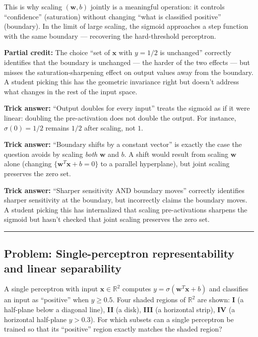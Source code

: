 \documentclass[12pt]{amsart}
\newcommand{\divider}{
  \vspace{-1em}
  \noindent
  \raisebox{-0.15ex}{\textbullet}%
  \hspace{0.5em}%
  \rule[0.5ex]{0.95\textwidth}{1.0pt}%
  \hspace{0.5em}%
  \raisebox{-0.15ex}{\textbullet}%
  \vspace{0em}
}
\begin{document}
This is why scaling $(\mathbf{w}, b)$ jointly is a meaningful operation:
it controls ``confidence'' (saturation) without changing ``what is classified
positive'' (boundary). In the limit of large scaling, the sigmoid approaches
a step function with the same boundary --- recovering the hard-threshold
perceptron.

\textbf{Partial credit:}
The choice ``set of $\mathbf{x}$ with $y = 1/2$ is unchanged'' correctly
identifies that the boundary is unchanged --- the harder of the two effects ---
but misses the saturation-sharpening effect on output values away from the
boundary. A student picking this has the geometric invariance right but
doesn't address what changes in the rest of the input space.

\textbf{Trick answer:}
``Output doubles for every input'' treats the sigmoid as if it were linear:
doubling the pre-activation does not double the output. For instance,
$\sigma(0) = 1/2$ remains $1/2$ after scaling, not $1$.

\textbf{Trick answer:}
``Boundary shifts by a constant vector'' is exactly the case the question
avoids by scaling \emph{both} $\mathbf{w}$ and $b$. A shift would result
from scaling $\mathbf{w}$ alone (changing $\{\mathbf{w}^T\mathbf{x} + b = 0\}$
to a parallel hyperplane), but joint scaling preserves the zero set.

\textbf{Trick answer:}
``Sharper sensitivity AND boundary moves'' correctly identifies sharper
sensitivity at the boundary, but incorrectly claims the boundary moves.
A student picking this has internalized that scaling pre-activations sharpens
the sigmoid but hasn't checked that joint scaling preserves the zero set.

\divider

\subsection*{Problem: Single-perceptron representability and linear separability}

A single perceptron with input $\mathbf{x} \in \mathbb{R}^2$ computes
$y = \sigma(\mathbf{w}^T\mathbf{x} + b)$ and classifies an input as
``positive'' when $y \geq 0.5$. Four shaded regions of $\mathbb{R}^2$ are shown:
\textbf{I} (a half-plane below a diagonal line),
\textbf{II} (a disk),
\textbf{III} (a horizontal strip),
\textbf{IV} (a horizontal half-plane $y > 0.3$).
For which subsets can a single perceptron be trained so that its
``positive'' region exactly matches the shaded region?
\end{document}
